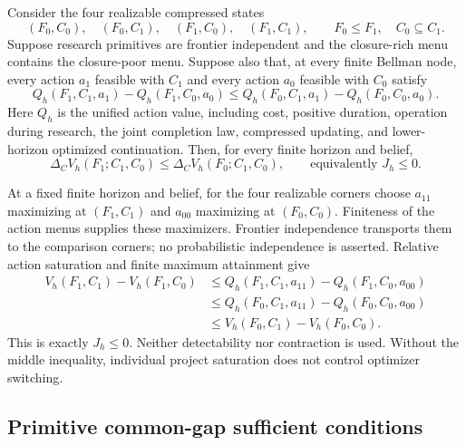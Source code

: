 \begin{theorem}
\label{thm:frontier-closure-substitution}
Consider the four realizable compressed states
\[
 (F_0,C_0),\quad(F_0,C_1),\quad(F_1,C_0),\quad(F_1,C_1),
 \qquad F_0\le F_1,\quad C_0\subseteq C_1.
\]
Suppose research primitives are frontier independent and the closure-rich
menu contains the closure-poor menu.  Suppose also that, at every finite
Bellman node, every action \(a_1\) feasible with \(C_1\) and every action
\(a_0\) feasible with \(C_0\) satisfy
\begin{equation}\label{eq:t7-relative-saturation}
 Q_h(F_1,C_1,a_1)-Q_h(F_1,C_0,a_0)
 \le
 Q_h(F_0,C_1,a_1)-Q_h(F_0,C_0,a_0).
\end{equation}
Here \(Q_h\) is the unified action value, including cost, positive duration,
operation during research, the joint completion law, compressed updating,
and lower-horizon optimized continuation.  Then, for every finite horizon and
belief,
\[
 \Delta_CV_h(F_1;C_1,C_0)
 \le
 \Delta_CV_h(F_0;C_1,C_0),
 \qquad\text{equivalently }J_h\le0.
\]
\end{theorem}

At a fixed finite horizon and belief, for the four realizable corners choose
\(a_{11}\) maximizing at \((F_1,C_1)\) and \(a_{00}\) maximizing at
\((F_0,C_0)\).  Finiteness of the action menus supplies these maximizers.
Frontier independence transports them to the comparison corners; no
probabilistic independence is asserted.  Relative action saturation and
finite maximum attainment give
\[
\begin{aligned}
 V_h(F_1,C_1)-V_h(F_1,C_0)
 &\le Q_h(F_1,C_1,a_{11})-Q_h(F_1,C_0,a_{00})\\
 &\le Q_h(F_0,C_1,a_{11})-Q_h(F_0,C_0,a_{00})\\
 &\le V_h(F_0,C_1)-V_h(F_0,C_0).
\end{aligned}
\]
This is exactly \(J_h\le0\).  Neither detectability nor contraction is used.
Without the middle inequality, individual project saturation does not control
optimizer switching.

\subsection{Primitive common-gap sufficient conditions}

